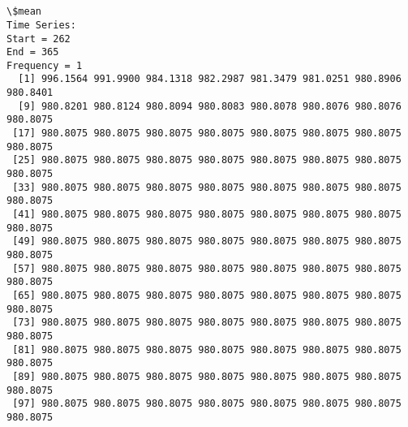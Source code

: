 \documentclass[11pt]{article}
\begin{document}
    \begin{center}
    \end{center}
    { \hspace*{\fill} \\}
    
    \begin{center}
    \end{center}
    { \hspace*{\fill} \\}
    
    \begin{Verbatim}[commandchars=\\\{\}]
\$mean
Time Series:
Start = 262 
End = 365 
Frequency = 1 
  [1] 996.1564 991.9900 984.1318 982.2987 981.3479 981.0251 980.8906 980.8401
  [9] 980.8201 980.8124 980.8094 980.8083 980.8078 980.8076 980.8076 980.8075
 [17] 980.8075 980.8075 980.8075 980.8075 980.8075 980.8075 980.8075 980.8075
 [25] 980.8075 980.8075 980.8075 980.8075 980.8075 980.8075 980.8075 980.8075
 [33] 980.8075 980.8075 980.8075 980.8075 980.8075 980.8075 980.8075 980.8075
 [41] 980.8075 980.8075 980.8075 980.8075 980.8075 980.8075 980.8075 980.8075
 [49] 980.8075 980.8075 980.8075 980.8075 980.8075 980.8075 980.8075 980.8075
 [57] 980.8075 980.8075 980.8075 980.8075 980.8075 980.8075 980.8075 980.8075
 [65] 980.8075 980.8075 980.8075 980.8075 980.8075 980.8075 980.8075 980.8075
 [73] 980.8075 980.8075 980.8075 980.8075 980.8075 980.8075 980.8075 980.8075
 [81] 980.8075 980.8075 980.8075 980.8075 980.8075 980.8075 980.8075 980.8075
 [89] 980.8075 980.8075 980.8075 980.8075 980.8075 980.8075 980.8075 980.8075
 [97] 980.8075 980.8075 980.8075 980.8075 980.8075 980.8075 980.8075 980.8075


\end{Verbatim}
\end{document}
